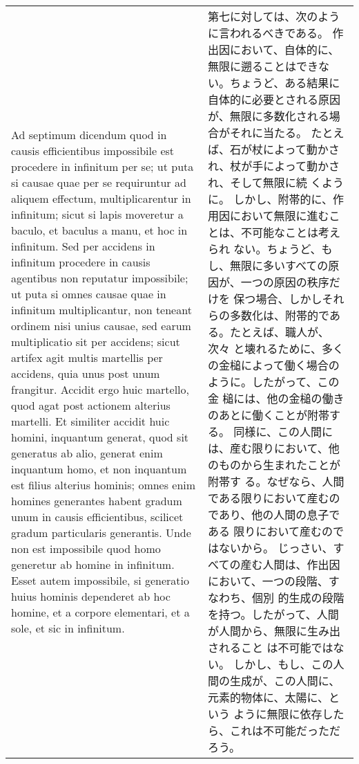 \documentclass[10pt]{jsarticle} %
\begin{document}
\begin{longtable}{p{21em}p{21em}}
Ad septimum dicendum quod in causis efficientibus impossibile est
 procedere in infinitum per se; ut puta si causae quae per se
 requiruntur ad aliquem effectum, multiplicarentur in infinitum; sicut
 si lapis moveretur a baculo, et baculus a manu, et hoc in
 infinitum. Sed per accidens in infinitum procedere in causis agentibus
 non reputatur
 impossibile; ut puta si omnes causae quae in infinitum
 multiplicantur, non teneant ordinem nisi unius causae, sed earum
 multiplicatio sit per accidens; sicut artifex agit multis martellis per
 accidens, quia unus post unum frangitur. Accidit ergo huic martello,
 quod agat post actionem alterius martelli. Et similiter accidit huic
 homini, inquantum generat, quod sit generatus ab alio, generat enim
 inquantum homo, et non inquantum est filius alterius hominis; omnes
 enim homines generantes habent gradum unum in causis efficientibus,
 scilicet gradum particularis generantis. Unde non est impossibile quod
 homo generetur ab homine in infinitum. Esset autem impossibile, si
 generatio huius hominis dependeret ab hoc homine, et a corpore
 elementari, et a sole, et sic in infinitum.

&
第七に対しては、次のように言われるべきである。
作出因において、自体的に、無限に遡ることはできない。ちょうど、ある結果に
 自体的に必要とされる原因が、無限に多数化される場合がそれに当たる。
たとえば、石が杖によって動かされ、杖が手によって動かされ、そして無限に続
 くように。
しかし、附帯的に、作用因において無限に進むことは、不可能なことは考えられ
 ない。ちょうど、もし、無限に多いすべての原因が、一つの原因の秩序だけを
 保つ場合、しかしそれらの多数化は、附帯的である。たとえば、職人が、次々
 と壊れるために、多くの金槌によって働く場合のように。したがって、この金
 槌には、他の金槌の働きのあとに働くことが附帯する。
同様に、この人間には、産む限りにおいて、他のものから生まれたことが附帯す
 る。なぜなら、人間である限りにおいて産むのであり、他の人間の息子である
 限りにおいて産むのではないから。
じっさい、すべての産む人間は、作出因において、一つの段階、すなわち、個別
 的生成の段階を持つ。したがって、人間が人間から、無限に生み出されること
 は不可能ではない。
しかし、もし、この人間の生成が、この人間に、元素的物体に、太陽に、という
 ように無限に依存したら、これは不可能だっただろう。


\end{longtable}
\end{document}
